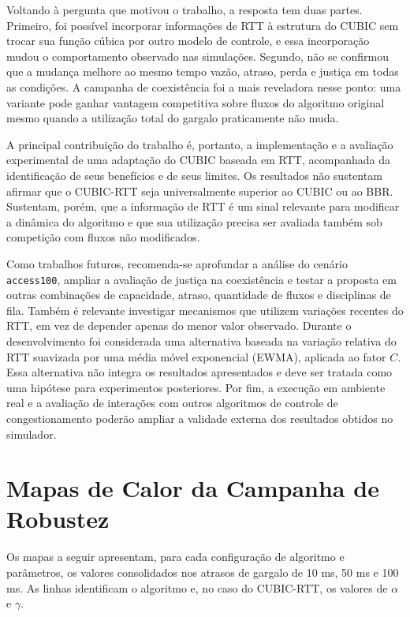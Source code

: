 \documentclass[a4paper,12pt]{monografia}
\begin{document}
Voltando à pergunta que motivou o trabalho, a resposta tem duas partes. Primeiro, foi possível incorporar informações de RTT à estrutura do CUBIC sem trocar sua função cúbica por outro modelo de controle, e essa incorporação mudou o comportamento observado nas simulações. Segundo, não se confirmou que a mudança melhore ao mesmo tempo vazão, atraso, perda e justiça em todas as condições. A campanha de coexistência foi a mais reveladora nesse ponto: uma variante pode ganhar vantagem competitiva sobre fluxos do algoritmo original mesmo quando a utilização total do gargalo praticamente não muda.

A principal contribuição do trabalho é, portanto, a implementação e a avaliação experimental de uma adaptação do CUBIC baseada em RTT, acompanhada da identificação de seus benefícios e de seus limites. Os resultados não sustentam afirmar que o CUBIC-RTT seja universalmente superior ao CUBIC ou ao BBR. Sustentam, porém, que a informação de RTT é um sinal relevante para modificar a dinâmica do algoritmo e que sua utilização precisa ser avaliada também sob competição com fluxos não modificados.

Como trabalhos futuros, recomenda-se aprofundar a análise do cenário \texttt{access100}, ampliar a avaliação de justiça na coexistência e testar a proposta em outras combinações de capacidade, atraso, quantidade de fluxos e disciplinas de fila. Também é relevante investigar mecanismos que utilizem variações recentes do RTT, em vez de depender apenas do menor valor observado. Durante o desenvolvimento foi considerada uma alternativa baseada na variação relativa do RTT suavizada por uma média móvel exponencial (EWMA), aplicada ao fator $C$. Essa alternativa não integra os resultados apresentados e deve ser tratada como uma hipótese para experimentos posteriores. Por fim, a execução em ambiente real e a avaliação de interações com outros algoritmos de controle de congestionamento poderão ampliar a validade externa dos resultados obtidos no simulador.

\appendix

\section{Mapas de Calor da Campanha de Robustez}
\label{ap:robustez}

Os mapas a seguir apresentam, para cada configuração de algoritmo e parâmetros, os valores consolidados nos atrasos de gargalo de 10 ms, 50 ms e 100 ms. As linhas identificam o algoritmo e, no caso do CUBIC-RTT, os valores de $\alpha$ e $\gamma$.
\end{document}
